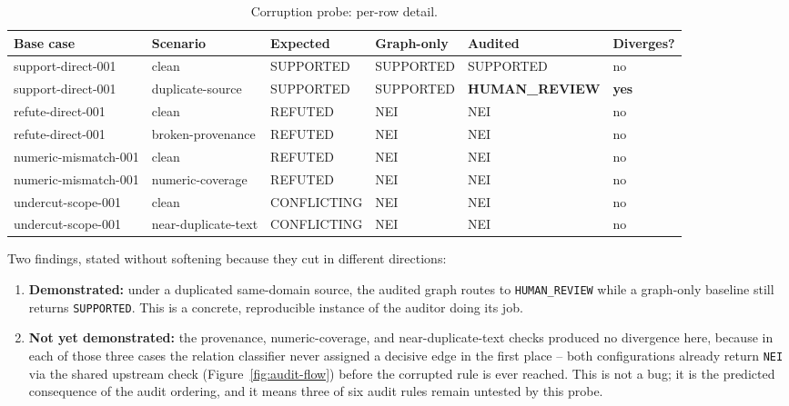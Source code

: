 \documentclass[12pt,a4paper,openany]{report}
\begin{document}
\begin{table}[H]
\centering
\caption{Corruption probe: per-row detail.}
\label{tab:corruption-detail-2}
\scriptsize
\begin{tabularx}{\textwidth}{p{2.0cm}p{2.4cm}p{1.7cm}p{1.7cm}p{2.1cm}p{1.3cm}}
\toprule
Base case & Scenario & Expected & Graph-only & Audited & Diverges? \\
\midrule
support-direct-001 & clean & SUPPORTED & SUPPORTED & SUPPORTED & no \\
support-direct-001 & duplicate-source & SUPPORTED & SUPPORTED & \textbf{HUMAN\_\allowbreak REVIEW} & \textbf{yes} \\
refute-direct-001 & clean & REFUTED & NEI & NEI & no \\
refute-direct-001 & broken-provenance & REFUTED & NEI & NEI & no \\
numeric-mismatch-001 & clean & REFUTED & NEI & NEI & no \\
numeric-mismatch-001 & numeric-coverage & REFUTED & NEI & NEI & no \\
undercut-scope-001 & clean & CONFLICTING & NEI & NEI & no \\
undercut-scope-001 & near-duplicate-text & CONFLICTING & NEI & NEI & no \\
\bottomrule
\end{tabularx}
\end{table}

Two findings, stated without softening because they cut in different directions:
\begin{enumerate}
  \item \textbf{Demonstrated:} under a duplicated same-domain source, the audited graph routes to \texttt{HUMAN\_REVIEW} while a graph-only baseline still returns \texttt{SUPPORTED}. This is a concrete, reproducible instance of the auditor doing its job.
  \item \textbf{Not yet demonstrated:} the provenance, numeric-coverage, and near-duplicate-text checks produced no divergence here, because in each of those three cases the relation classifier never assigned a decisive edge in the first place -- both configurations already return \texttt{NEI} via the shared upstream check (Figure~\ref{fig:audit-flow}) before the corrupted rule is ever reached. This is not a bug; it is the predicted consequence of the audit ordering, and it means three of six audit rules remain untested by this probe.
\end{enumerate}
\end{document}
